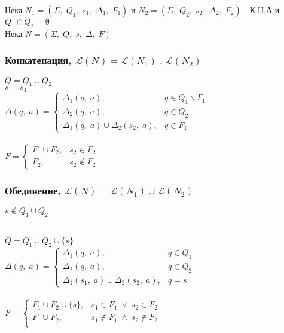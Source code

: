 \documentclass[12pt]{article}
\newcommand{\Lang}{\mathcal{L}}
\begin{document}
Нека $N_1 = (\Sigma, \; Q_1, \; s_1, \; \Delta_1, \; F_1)$ и $N_2 = (\Sigma, \; Q_2, \; s_2, \; \Delta_2, \; F_2)$  - К.Н.А и $Q_1 \cap Q_2 = \emptyset$ \\

Нека $N = (\Sigma, \; Q, \; s, \; \Delta, \; F)$

\subsubsection*{Конкатенация, $\Lang(N) = \Lang(N_1) \; . \; \Lang(N_2)$}

$Q = Q_1 \cup Q_2$ \\

$s = s_1$ \\

$\Delta(q, \; a) = \begin{cases}
    \Delta_1(q, \; a), & q \in Q_1 \backslash F_1 \\
    \Delta_2(q, \; a), & q \in Q_2 \\
    \Delta_1(q, \; a) \cup \Delta_2(s_2, \; a), & q \in F_1
\end{cases}$ \\\\

$F = \begin{cases}
  F_1 \cup F_2, & s_2 \in F_2\\
  F_2, & s_2 \notin F_2  
\end{cases}$

\subsubsection*{Обединение, $\Lang(N) = \Lang(N_1) \cup \Lang(N_2)$}

$s \not \in Q_1 \cup Q_2$ \\\

$Q = Q_1 \cup Q_2 \cup \{s\}$ \\

$\Delta(q, \; a) = \begin{cases}
    \Delta_1(q, \; a), & q \in Q_1 \\
    \Delta_2(q, \; a), & q \in Q_2 \\
    \Delta_1(s_1, \; a) \cup \Delta_2(s_2, \; a), & q = s
\end{cases}$ \\\\

$F = \begin{cases}
  F_1 \cup F_2 \cup \{s\}, & s_1 \in F_1 \; \lor \; s_2 \in F_2 \\
  F_1 \cup F_2, & s_1 \notin F_1 \; \land \; s_2 \notin F_2 \\
\end{cases}$
\end{document}
